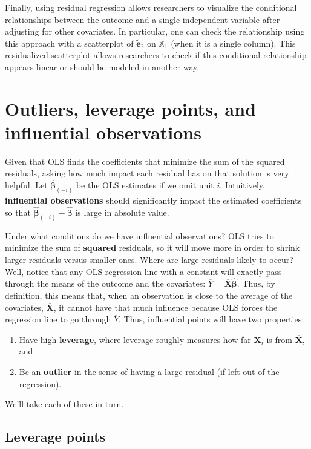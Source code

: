 \documentclass[
  13pt,
  letterpaper,
  DIV=11,
  numbers=noendperiod]{scrreprt}
\providecommand{\tightlist}{%
  \setlength{\itemsep}{0pt}\setlength{\parskip}{0pt}}\usepackage{longtable,booktabs,array}
\newcommand{\mb}{\symbf}
\newcommand{\X}{\mb{X}}
\newcommand{\Xmat}{\mathbb{X}}
\newcommand{\bhat}{\widehat{\mb{\beta}}}
\theoremstyle{plain}
\theoremstyle{definition}
\theoremstyle{definition}
\theoremstyle{remark}
\begin{document}
Finally, using residual regression allows researchers to visualize the
conditional relationships between the outcome and a single independent
variable after adjusting for other covariates. In particular, one can
check the relationship using this approach with a scatterplot of
\(\widetilde{\mb{e}}_2\) on \(\Xmat_1\) (when it is a single column).
This residualized scatterplot allows researchers to check if this
conditional relationship appears linear or should be modeled in another
way.

\section{Outliers, leverage points, and influential
observations}\label{outliers-leverage-points-and-influential-observations}

Given that OLS finds the coefficients that minimize the sum of the
squared residuals, asking how much impact each residual has on that
solution is very helpful. Let \(\bhat_{(-i)}\) be the OLS estimates if
we omit unit \(i\). Intuitively, \textbf{influential observations}
should significantly impact the estimated coefficients so that
\(\bhat_{(-i)} - \bhat\) is large in absolute value.

Under what conditions do we have influential observations? OLS tries to
minimize the sum of \textbf{squared} residuals, so it will move more in
order to shrink larger residuals versus smaller ones. Where are large
residuals likely to occur? Well, notice that any OLS regression line
with a constant will exactly pass through the means of the outcome and
the covariates: \(\overline{Y} = \overline{\X}\bhat\). Thus, by
definition, this means that, when an observation is close to the average
of the covariates, \(\overline{\X}\), it cannot have that much influence
because OLS forces the regression line to go through \(\overline{Y}\).
Thus, influential points will have two properties:

\begin{enumerate}
\def\labelenumi{\arabic{enumi}.}
\tightlist
\item
  Have high \textbf{leverage}, where leverage roughly measures how far
  \(\X_i\) is from \(\overline{\X}\), and
\item
  Be an \textbf{outlier} in the sense of having a large residual (if
  left out of the regression).
\end{enumerate}

We'll take each of these in turn.

\subsection{Leverage points}\label{sec-leverage}
\end{document}
